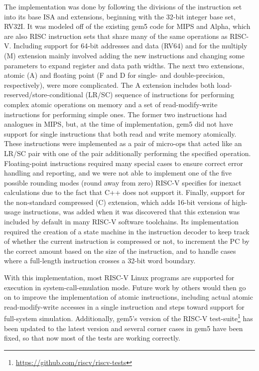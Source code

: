 The implementation was done by following the divisions of the instruction set into its base ISA and extensions, beginning with the 32-bit integer base set, RV32I.
It was modeled off of the existing gem5 code for MIPS and Alpha, which are also RISC instruction sets that share many of the same operations as RISC-V.
Including support for 64-bit addresses and data (RV64) and for the multiply (M) extension mainly involved adding the new instructions and changing some parameters to expand register and data path widths.
The next two extensions, atomic (A) and floating point (F and D for single- and double-precision, respectively), were more complicated.
The A extension includes both load-reserved/store-conditional (LR/SC) sequence of instructions for performing complex atomic operations on memory and a set of read-modify-write instructions for performing simple ones.
The former two instructions had analogues in MIPS, but, at the time of implementation, gem5 did not have support for single instructions that both read and write memory atomically.
These instructions were implemented as a pair of micro-ops that acted like an LR/SC pair with one of the pair additionally performing the specified operation.
Floating-point instructions required many special cases to ensure correct error handling and reporting, and we were not able to implement one of the five possible rounding modes (round away from zero) RISC-V specifies for inexact calculations due to the fact that C++ does not support it.
Finally, support for the non-standard compressed (C) extension, which adds 16-bit versions of high-usage instructions, was added when it was discovered that this extension was included by default in many RISC-V software toolchains.
Its implementation required the creation of a state machine in the instruction decoder to keep track of whether the current instruction is compressed or not, to increment the PC by the correct amount based on the size of the instruction, and to handle cases where a full-length instruction crosses a 32-bit word boundary.

With this implementation, most RISC-V Linux programs are supported for execution in system-call-emulation mode.
Future work by others would then go on to improve the implementation of atomic instructions, including actual atomic read-modify-write accesses in a single instruction and steps toward support for full-system simulation.
Additionally, gem5's version of the RISC-V test-suite\footnote{\url{https://github.com/riscv/riscv-tests}} has been updated to the latest version and several corner cases in gem5 have been fixed, so that now most of the tests are working correctly.

